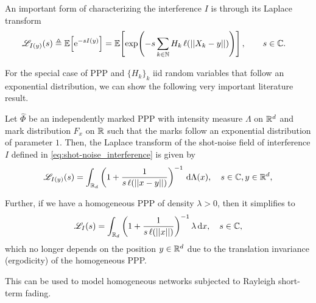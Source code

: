
An important form of characterizing the interference $I$ is through its Laplace transform
\begin{align*}
    \mathscr{L}_{I(y)}(s) &\triangleq {\mathbb E}\!\left[\mathrm{e}^{-sI(y)}\right] 
        = {\mathbb E}\!\left[ \exp\!\left( -s \sum_{k\in{\mathbb N}} H_k\,\ell(||X_k-y||)  \right) \right], \qquad s\in{\mathbb C}.
\end{align*}

For the special case of PPP and $\{H_k\}_k$ iid random variables that follow an exponential distribution, we can show the following very important literature result.
\begin{theorem}
     Let $\hat\Phi$ be an independently marked PPP with intensity measure $\Lambda$ on ${\mathbb R}^d$ and mark distribution $F_x$ on ${\mathbb R}$ such that the marks follow an exponential distribution of parameter $1$.
     Then, the Laplace transform of the shot-noise field of interference $I$ defined in \eqref{eq:shot-noise_interference} is given by
     \begin{align*}
         \mathscr{L}_{I(y)}(s) = \int_{{\mathbb R}_d} \left(1 + \frac{1}{s\,\ell(||x-y||)}\right)^{-1}\,\mathrm{d}\Lambda(x),\quad s\in{\mathbb C}, y\in{\mathbb R}^d,
     \end{align*}
    
    Further, if we have a homogeneous PPP of density $\lambda > 0$, then it simplifies to
    \begin{align*}
         \mathscr{L}_I(s) = \int_{{\mathbb R}_d} \left(1 + \frac{1}{s\,\ell(||x||)}\right)^{-1} \lambda\,\mathrm{d} x,\quad s\in{\mathbb C},
     \end{align*}
     which no longer depends on the position $y\in{\mathbb R}^d$ due to the translation invariance (ergodicity) of the homogeneous PPP.
\end{theorem}
This can be used to model homogeneous networks subjected to Rayleigh short-term fading.


